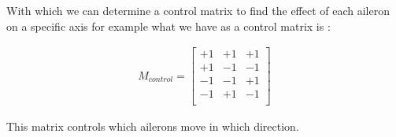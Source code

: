 With which we can determine a control matrix to find the effect of each aileron
on a specific axis for example what we have as a control matrix is :

\begin{gather*}
    M_{control} =
    \begin{bmatrix}
        +1 & +1 & +1 \\
        +1 & -1 & -1 \\
        -1 & -1 & +1 \\
        -1 & +1 & -1 \\
    \end{bmatrix}
\end{gather*}

This matrix controls which ailerons move in which direction.